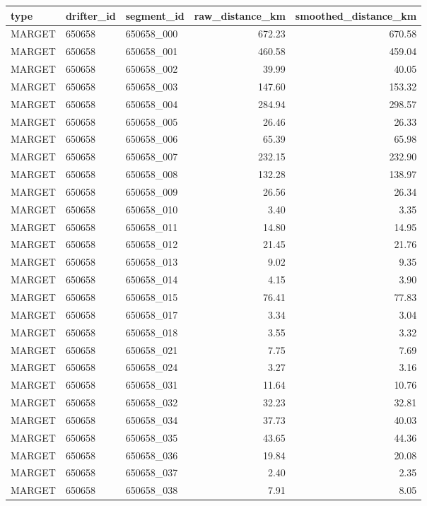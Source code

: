 \begin{tabular}{lllrr}
\toprule
type & drifter_id & segment_id & raw_distance_km & smoothed_distance_km \\
\midrule
MARGET & 650658 & 650658_000 & 672.23 & 670.58 \\
MARGET & 650658 & 650658_001 & 460.58 & 459.04 \\
MARGET & 650658 & 650658_002 & 39.99 & 40.05 \\
MARGET & 650658 & 650658_003 & 147.60 & 153.32 \\
MARGET & 650658 & 650658_004 & 284.94 & 298.57 \\
MARGET & 650658 & 650658_005 & 26.46 & 26.33 \\
MARGET & 650658 & 650658_006 & 65.39 & 65.98 \\
MARGET & 650658 & 650658_007 & 232.15 & 232.90 \\
MARGET & 650658 & 650658_008 & 132.28 & 138.97 \\
MARGET & 650658 & 650658_009 & 26.56 & 26.34 \\
MARGET & 650658 & 650658_010 & 3.40 & 3.35 \\
MARGET & 650658 & 650658_011 & 14.80 & 14.95 \\
MARGET & 650658 & 650658_012 & 21.45 & 21.76 \\
MARGET & 650658 & 650658_013 & 9.02 & 9.35 \\
MARGET & 650658 & 650658_014 & 4.15 & 3.90 \\
MARGET & 650658 & 650658_015 & 76.41 & 77.83 \\
MARGET & 650658 & 650658_017 & 3.34 & 3.04 \\
MARGET & 650658 & 650658_018 & 3.55 & 3.32 \\
MARGET & 650658 & 650658_021 & 7.75 & 7.69 \\
MARGET & 650658 & 650658_024 & 3.27 & 3.16 \\
MARGET & 650658 & 650658_031 & 11.64 & 10.76 \\
MARGET & 650658 & 650658_032 & 32.23 & 32.81 \\
MARGET & 650658 & 650658_034 & 37.73 & 40.03 \\
MARGET & 650658 & 650658_035 & 43.65 & 44.36 \\
MARGET & 650658 & 650658_036 & 19.84 & 20.08 \\
MARGET & 650658 & 650658_037 & 2.40 & 2.35 \\
MARGET & 650658 & 650658_038 & 7.91 & 8.05 \\

\end{tabular}
